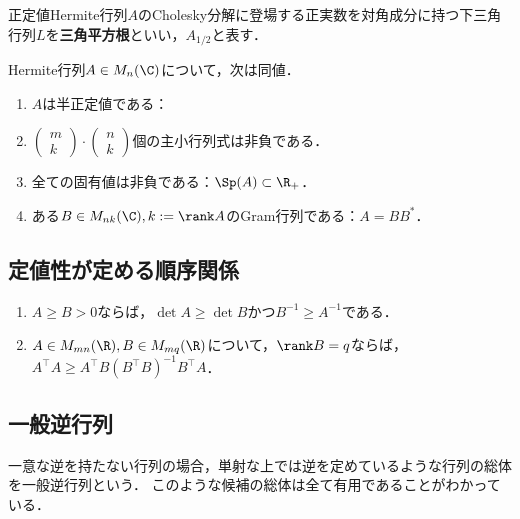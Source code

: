 \documentclass[uplatex, dvipdfmx]{jsreport}
\begin{document}
\begin{definition}
    正定値Hermite行列$A$のCholesky分解に登場する正実数を対角成分に持つ下三角行列$L$を\textbf{三角平方根}といい，$A_{1/2}$と表す．
\end{definition}

\begin{theorem}
    Hermite行列$A\in M_n(\C)$について，次は同値．
    \begin{enumerate}
        \item $A$は半正定値である：
        \item $\begin{pmatrix}m\\k\end{pmatrix}\cdot \begin{pmatrix}n\\k\end{pmatrix}$個の主小行列式は非負である．
        \item 全ての固有値は非負である：$\Sp(A)\subset\R_+$．
        \item ある$B\in M_{nk}(\C),k:=\rank A$のGram行列である：$A=BB^*$．
    \end{enumerate}
\end{theorem}

\subsection{定値性が定める順序関係}

\begin{proposition}\mbox{}
    \begin{enumerate}
        \item $A\ge B>0$ならば，$\det A\ge\det B$かつ$B^{-1}\ge A^{-1}$である．
        \item $A\in M_{mn}(\R),B\in M_{mq}(\R)$について，$\rank B=q$ならば，$A^\top A\ge A^\top B(B^\top B)^{-1}B^\top A$．
    \end{enumerate}
\end{proposition}

\subsection{一般逆行列}

\begin{tcolorbox}[colframe=ForestGreen, colback=ForestGreen!10!white,breakable,colbacktitle=ForestGreen!40!white,coltitle=black,fonttitle=\bfseries\sffamily,
title=]
    一意な逆を持たない行列の場合，単射な上では逆を定めているような行列の総体を一般逆行列という．
    このような候補の総体は全て有用であることがわかっている．
\end{tcolorbox}
\end{document}
